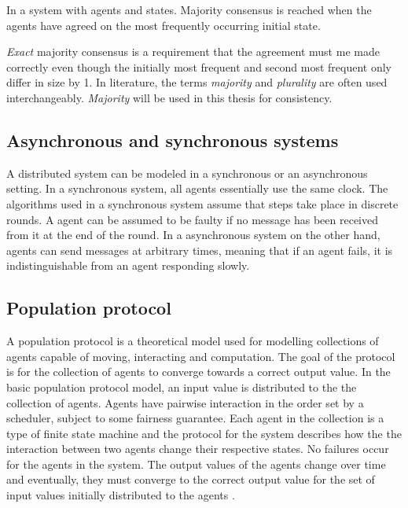 \begin{definition}
In a system with  agents and  states. Majority consensus is reached when the agents have agreed on the most frequently occurring initial state. 
\end{definition}
 
 \emph{Exact} majority consensus is a requirement that the agreement must me made correctly even though the initially most frequent and second most frequent only differ in size by 1. In literature, the terms \emph{majority} and \emph{plurality} are often used interchangeably. \emph{Majority} will be used in this thesis for consistency.



\subsection{Asynchronous and synchronous systems}

A distributed system can be modeled in a synchronous or an asynchronous setting. In a synchronous system, all agents essentially use the same clock. The algorithms used in a synchronous system assume that steps take place in discrete rounds. A agent can be assumed to be faulty if no message has been received from it at the end of the round. In a asynchronous system on the other hand, agents can send messages at arbitrary times, meaning that if an agent fails, it is indistinguishable from an agent responding slowly.


\subsection{Population protocol}
 A population protocol is a theoretical model used for modelling collections of agents capable of moving, interacting and computation. The goal of the protocol is for the collection of agents to converge towards a correct output value. In the basic population protocol model, an input value is distributed to the the collection of agents. Agents have pairwise interaction in the order set by a scheduler, subject to some fairness guarantee. Each agent in the collection is a type of finite state machine and the protocol for the system describes how the the interaction between two agents change their respective states. No failures occur for the agents in the system. The output values of the agents change over time and eventually, they must converge to the correct output value for the set of input values initially distributed to the agents \cite{aspnesIntroductionPopulationProtocols2009}. 

